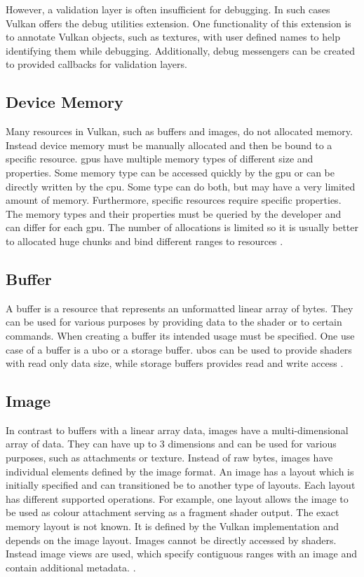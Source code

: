 However, a validation layer is often insufficient for debugging. In such cases Vulkan offers the debug utilities extension. One functionality of this extension is to annotate Vulkan objects, such as textures, with user defined names to help identifying them while debugging. Additionally, debug messengers can be created to provided callbacks for validation layers.
\cite{khronos:vulkan:spec1.1}

\subsection{Device Memory}
Many resources in Vulkan, such as buffers and images, do not allocated memory. Instead device memory must be manually allocated and then be bound to a specific resource. \Glspl{gpu} have multiple memory types of different size and properties. Some memory type can be accessed quickly by the \gls{gpu} or can be directly written by the \gls{cpu}. Some type can do both, but may have a very limited amount of memory. Furthermore, specific resources require specific properties. The memory types and their properties must be queried by the developer and can differ for each \gls{gpu}. The number of allocations is limited so it is usually better to allocated huge chunks and bind different ranges to resources \cite{khronos:vulkan:spec1.1}.

\subsection{Buffer}
\label{section:buffer}
A buffer is a resource that represents an unformatted linear array of bytes. They can be used for various purposes by providing data to the shader or to certain commands. When creating a buffer its intended usage must be specified. One use case of a buffer is a \gls{ubo} or a storage buffer. \Glspl{ubo} can be used to provide shaders with read only data size, while storage buffers provides read and write access \cite{khronos:vulkan:spec1.1}.

\subsection{Image}
In contrast to buffers with a linear array data, images have a multi-dimensional array of data. They can have up to 3 dimensions and can be used for various purposes, such as attachments or texture. Instead of raw bytes, images have individual elements defined by the image format. An image has a layout which is initially specified and can transitioned be to another type of layouts. Each layout has different supported operations.
For example, one layout allows the image to be used as colour attachment serving as a fragment shader output. The exact memory layout is not known. It is defined by the Vulkan implementation and depends on the image layout. 
Images cannot be directly accessed by shaders. Instead image views are used, which specify contiguous ranges with an image and contain additional metadata. \cite{khronos:vulkan:spec1.1}.

